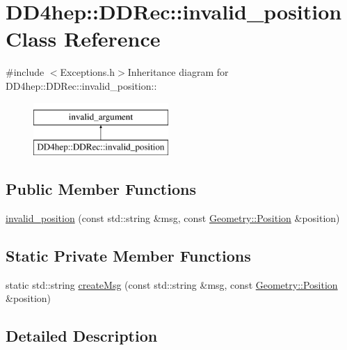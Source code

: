\hypertarget{class_d_d4hep_1_1_d_d_rec_1_1invalid__position}{
\section{DD4hep::DDRec::invalid\_\-position Class Reference}
\label{class_d_d4hep_1_1_d_d_rec_1_1invalid__position}
}


{\ttfamily \#include $<$Exceptions.h$>$}Inheritance diagram for DD4hep::DDRec::invalid\_\-position::\begin{figure}[H]
\begin{center}
\leavevmode
\includegraphics[height=2cm]{class_d_d4hep_1_1_d_d_rec_1_1invalid__position}
\end{center}
\end{figure}
\subsection*{Public Member Functions}
\begin{DoxyCompactItemize}
\item 
\hyperlink{class_d_d4hep_1_1_d_d_rec_1_1invalid__position_aa71858d5b379311e9530ceabc0f99455}{invalid\_\-position} (const std::string \&msg, const \hyperlink{namespace_d_d4hep_1_1_geometry_a55083902099d03506c6db01b80404900}{Geometry::Position} \&position)
\end{DoxyCompactItemize}
\subsection*{Static Private Member Functions}
\begin{DoxyCompactItemize}
\item 
static std::string \hyperlink{class_d_d4hep_1_1_d_d_rec_1_1invalid__position_af04d48b510823d5fd98ebb75a1ed52c0}{createMsg} (const std::string \&msg, const \hyperlink{namespace_d_d4hep_1_1_geometry_a55083902099d03506c6db01b80404900}{Geometry::Position} \&position)
\end{DoxyCompactItemize}


\subsection{Detailed Description}


